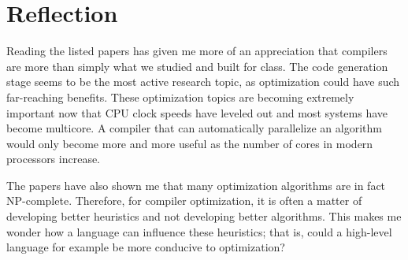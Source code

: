 \documentclass[12pt,letterpaper]{article}
\begin{document}
\section{Reflection}
Reading the listed papers has given me more of an appreciation that compilers
are more than simply what we studied and built for class. The code generation
stage seems to be the most active research topic, as optimization could have
such far-reaching benefits. These optimization topics are becoming extremely
important now that CPU clock speeds have leveled out and most systems have
become multicore. A compiler that can automatically parallelize an algorithm
would only become more and more useful as the number of cores in modern
processors increase.

The papers have also shown me that many optimization algorithms are in fact
NP-complete. Therefore, for compiler optimization, it is often a matter of
developing better heuristics and not developing better algorithms. This makes me
wonder how a language can influence these heuristics; that is, could a
high-level language for example be more conducive to optimization?

\pagebreak

\nocite{*}


\end{document}
